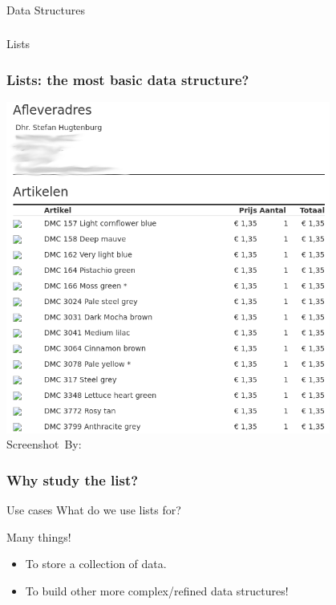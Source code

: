 \begin{frame}[fragile]\frametitle{}
\begin{center}
{\Large Data Structures}
\end{center}

\end{frame}


\begin{frame}[fragile]\frametitle{}
\begin{center}
{\Large Lists}
\end{center}

\end{frame}

\begin{frame}
	\frametitle{Lists: the most basic data structure?}
	\begin{center}
		\includegraphics[width=0.8\textwidth]{images/list.png}\\
		\hspace*{15pt}\hbox{\scriptsize Screenshot By:}
	\end{center}
\end{frame}

\begin{frame}
	\frametitle{Why study the list?}
	\begin{block}{Use cases}
		What do we use lists for?	
	\end{block}
	\pause
	\begin{block}{Many things!}
		\begin{itemize}
			\item To store a collection of data.
				\pause
			\item To build other more complex/refined data structures!
		\end{itemize}
	\end{block}
\end{frame}

